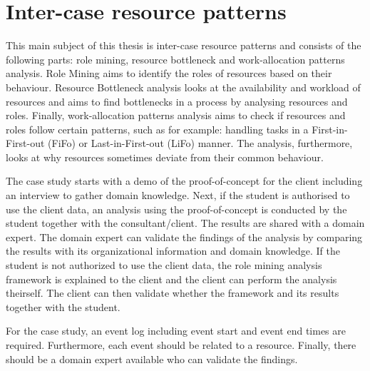 \chapter*{Inter-case resource patterns}
This main subject of this thesis is inter-case resource patterns and consists of the following parts: role mining, resource bottleneck and work-allocation patterns analysis. Role Mining aims to identify the roles of resources based on their behaviour. Resource Bottleneck analysis looks at the availability and workload of resources and aims to find bottlenecks in a process by analysing resources and roles. Finally, work-allocation patterns analysis aims to check if resources and roles follow certain patterns, such as for example: handling tasks in a First-in-First-out (FiFo) or Last-in-First-out (LiFo) manner. The analysis, furthermore, looks at why resources sometimes deviate from their common behaviour. 

The case study starts with a demo of the proof-of-concept for the client including an interview to gather domain knowledge. Next, if the student is authorised to use the client data, an analysis using the proof-of-concept is conducted by the student together with the consultant/client. The results are shared with a domain expert. The domain expert can validate the findings of the analysis by comparing the results with its organizational information and domain knowledge. If the student is not authorized to use the client data, the role mining analysis framework is explained to the client and the client can perform the analysis theirself. The client can then validate whether the framework and its results together with the student.

For the case study, an event log including event start and event end times are required. Furthermore, each event should be related to a resource. Finally, there should be a domain expert available who can validate the findings. 


